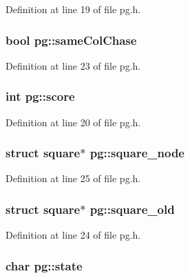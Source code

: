 Definition at line 19 of file pg.\-h.

\hypertarget{structpg_aa4327d97fd1bdb12a750625e88b499da}{
\subsubsection[{same\-Col\-Chase}]{\setlength{\rightskip}{0pt plus 5cm}bool pg\-::same\-Col\-Chase}}\label{structpg_aa4327d97fd1bdb12a750625e88b499da}


Definition at line 23 of file pg.\-h.

\hypertarget{structpg_a3f4280c7c54a1788967649d7e044cd16}{
\subsubsection[{score}]{\setlength{\rightskip}{0pt plus 5cm}int pg\-::score}}\label{structpg_a3f4280c7c54a1788967649d7e044cd16}


Definition at line 20 of file pg.\-h.

\hypertarget{structpg_a6210bbfa47c8aecec8e0b8c0bcd453d6}{
\subsubsection[{square\-\_\-node}]{\setlength{\rightskip}{0pt plus 5cm}struct {\bf square}$\ast$ pg\-::square\-\_\-node}}\label{structpg_a6210bbfa47c8aecec8e0b8c0bcd453d6}


Definition at line 25 of file pg.\-h.

\hypertarget{structpg_a1c10440d8d1646e404190da0bbfa68ce}{
\subsubsection[{square\-\_\-old}]{\setlength{\rightskip}{0pt plus 5cm}struct {\bf square}$\ast$ pg\-::square\-\_\-old}}\label{structpg_a1c10440d8d1646e404190da0bbfa68ce}


Definition at line 24 of file pg.\-h.

\hypertarget{structpg_af135bcefc8517a60112ce65e20786b91}{
\subsubsection[{state}]{\setlength{\rightskip}{0pt plus 5cm}char pg\-::state}}\label{structpg_af135bcefc8517a60112ce65e20786b91}


